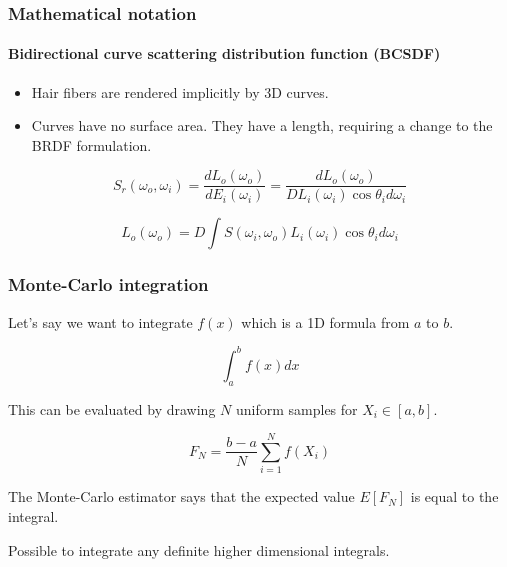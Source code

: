 \documentclass{beamer}
\begin{document}
\begin{frame}
    \frametitle{Mathematical notation}
	\framesubtitle{Bidirectional curve scattering distribution function (BCSDF)}
	
	\begin{itemize}
	\item Hair fibers are rendered implicitly by 3D curves.
	\item Curves have no surface area. They have a length, requiring a change to the BRDF formulation.
	\end{itemize}
	
	\begin{equation}
	S_r(\omega_o, \omega_i) = \frac{dL_o(\omega_o)}{dE_i(\omega_i)} = \frac{dL_o(\omega_o)}{DL_i(\omega_i) \cos \theta_i d\omega_i}
	\end{equation}
	
	\begin{equation}
	L_o(\omega_o) = D \int S(\omega_i, \omega_o) L_i(\omega_i) \cos \theta_i d\omega_i
	\end{equation}

  \end{frame}  
  
  
  
  \begin{frame}
    \frametitle{Monte-Carlo integration}
    
    Let's say we want to integrate $f(x)$ which is a  1D formula from $a$ to $b$.
    
    \begin{equation}
    \int_a^b f(x) dx
    \end{equation}
    
	This can be evaluated by drawing $N$ uniform samples for $X_i \in [a, b]$.
    
    \begin{equation}
    F_N = \frac{b-a}{N} \sum^N_{i=1} f(X_i)
    \end{equation}
    
    The Monte-Carlo estimator says that the expected value $E[F_N]$ is equal to the integral.
    
    Possible to integrate any definite higher dimensional integrals.
    
  \end{frame}
  
\end{document}
